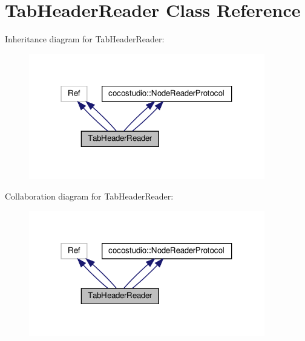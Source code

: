 \hypertarget{classTabHeaderReader}{}\section{Tab\+Header\+Reader Class Reference}
\label{classTabHeaderReader}


Inheritance diagram for Tab\+Header\+Reader\+:
\nopagebreak
\begin{figure}[H]
\begin{center}
\leavevmode
\includegraphics[width=292pt]{classTabHeaderReader__inherit__graph}
\end{center}
\end{figure}


Collaboration diagram for Tab\+Header\+Reader\+:
\nopagebreak
\begin{figure}[H]
\begin{center}
\leavevmode
\includegraphics[width=292pt]{classTabHeaderReader__coll__graph}
\end{center}
\end{figure}
